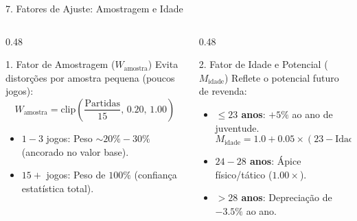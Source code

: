\documentclass[aspectratio=169, 10pt]{beamer}
\begin{document}
\begin{frame}{7. Fatores de Ajuste: Amostragem e Idade}
  \begin{columns}
    \begin{column}{0.48\textwidth}
      \begin{block}{1. Fator de Amostragem ($W_{\text{amostra}}$)}
        Evita distorções por amostra pequena (poucos jogos):
        \begin{equation*}
          W_{\text{amostra}} = \text{clip}\left(\frac{\text{Partidas}}{15}, \, 0.20, \, 1.00\right)
        \end{equation*}
        \begin{itemize}
          \item $1 - 3$ jogos: Peso $\sim 20\% - 30\%$ (ancorado no valor base).
          \item $15+$ jogos: Peso de $100\%$ (confiança estatística total).
        \end{itemize}
      \end{block}
    \end{column}
    
    \begin{column}{0.48\textwidth}
      \begin{block}{2. Fator de Idade e Potencial ($M_{\text{idade}}$)}
        Reflete o potencial futuro de revenda:
        \begin{itemize}
          \item \textbf{$\le 23$ anos}: $+5\%$ ao ano de juventude.
            \begin{equation*}
              M_{\text{idade}} = 1.0 + 0.05 \times (23 - \text{Idade})
            \end{equation*}
          \item \textbf{$24 - 28$ anos}: Ápice físico/tático ($1.00\times$).
          \item \textbf{$> 28$ anos}: Depreciação de $-3.5\%$ ao ano.
        \end{itemize}
      \end{block}
    \end{column}
  \end{columns}
\end{frame}
\end{document}
